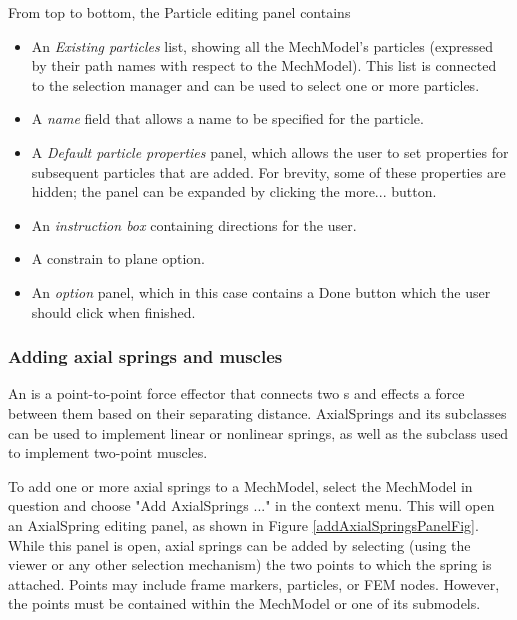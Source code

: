 \documentclass{article}
\begin{document}
From top to bottom, the Particle editing panel contains

\begin{itemize}

\item An {\it Existing particles} list, showing all the MechModel's particles
(expressed by their path names with respect to the MechModel). This
list is connected to the selection manager and can be used to select
one or more particles.

\item A {\it name} field that allows a name to be specified for the particle.

\item A {\it Default particle properties} panel, which allows the user to set
properties for subsequent particles that are added. For brevity, some
of these properties are hidden; the panel can be expanded by clicking
the {\sf more...} button.

\item An {\it instruction box} containing directions for the user.

\item A {\sf constrain to plane} option.

\item An {\it option} panel, which in this case contains a {\sf Done} button which
the user should click when finished.

\end{itemize}

\subsubsection{Adding axial springs and muscles}
\label{addingAxialSpringsSec}

An  is a point-to-point
force effector that connects two
s and effects a force between
them based on their separating distance. AxialSprings and its
subclasses can be used to implement linear or nonlinear springs, as
well as the subclass  used to
implement two-point muscles.

To add one or more axial springs to a MechModel, select the MechModel in
question and choose {\sf "Add AxialSprings ..."} in the context menu. This
will open an AxialSpring editing panel, as shown in
Figure \ref{addAxialSpringsPanelFig}. While this panel is open, axial springs can
be added by selecting (using the viewer or any other selection
mechanism) the two points to which the spring is attached.  Points may
include frame markers, particles, or FEM nodes.  However, the points
must be contained within the MechModel or one of its submodels.
\end{document}
